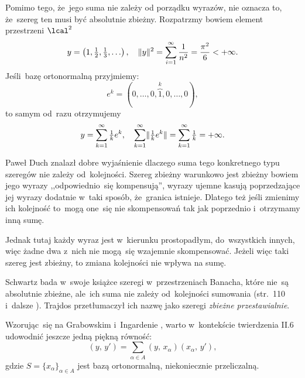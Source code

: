 \documentclass[a4paper,11pt]{article}
\begin{document}
Pomimo tego, że~jego suma nie zależy od porządku wyrazów, nie oznacza
to, że~szereg ten musi być absolutnie zbieżny. Rozpatrzmy bowiem
element przestrzeni $\lcal^{ 2 }$
\begin{equation*}
  \label{eq:RS-Vol-I-s01-19}
  y = \left( 1, \tfrac{ 1 }{ 2 }, \tfrac{ 1 }{ 3 }, \ldots \right), \quad
  \lVert{  y  }\rVert^{ 2 }
  = \sum_{ i = 1 }^{ \infty } \frac{ 1 }{ n^{ 2 } }
  = \frac{ \pi^{ 2 } }{ 6 } < +\infty.
\end{equation*}
Jeśli~bazę ortonormalną przyjmiemy:
\begin{equation}
  \label{eq:RS-Vol-I-s01-20}
  e^{ k } = ( 0, \ldots, 0, \overbrace{ 1 }^{ k }, 0, \ldots, 0),
\end{equation}
to samym od~razu otrzymujemy
\begin{equation}
  \label{eq:RS-Vol-I-s01-21}
  y =
  \sum_{ k = 1 }^{ \infty } \tfrac{ 1 }{ k } e^{ k }, \quad
  \sum_{ k = 1 }^{ \infty } \lVert{  \tfrac{ 1 }{ k } e^{ k }  }\rVert
  = \sum_{ k = 1 }^{ \infty } \tfrac{ 1 }{ k } = +\infty.
\end{equation}

Paweł Duch znalazł dobre wyjaśnienie dlaczego suma tego konkretnego
typu szeregów nie zależy od~kolejności. Szereg zbieżny warunkowo jest
zbieżny bowiem jego wyrazy ,,odpowiednio~się kompensują'', wyrazy
ujemne kasują poprzedzające jej wyrazy dodatnie w~taki sposób,
że~granica istnieje. Dlatego też jeśli zmienimy ich kolejność to~mogą
one~się nie skompensowań tak jak poprzednio i~otrzymamy inną sumę.

Jednak tutaj każdy wyraz jest w~kierunku prostopadłym, do~wszystkich
innych, więc żadne dwa z~nich nie mogą~się wzajemnie skompensować.
Jeżeli więc taki szereg jest zbieżny, to zmiana kolejności nie wpływa
na sumę.

Schwartz bada w~swoje książce szeregi w~przestrzeniach Banacha, które
nie~są absolutnie zbieżne, ale~ich suma nie zależy od~kolejności
sumowania (str.~110 i~dalsze
\cite{SchwartzKursAnalizyMatematycznejVolI1979}). Trajdos przetłumaczył ich
nazwę jako szeregi \textit{zbieżne przestawialnie}. %

\vspace{\spaceFour}



\start {} Wzorując~się na Grabowskim i~Ingardenie
\cite{GrabowskiIngardenMechanikaKwantowa1987}, warto w~kontekście
twierdzenia II.6 udowodnić jeszcze jedną piękną równość:
\begin{equation}
  \label{eq:RS-Vol-I-s01-22}
  ( y, \, y' ) =
  \sum_{ \alpha \in A } ( y, \, x_{ \alpha } ) ( x_{ \alpha }, \, y' ),
\end{equation}
gdzie $S = \{ x_{ \alpha } \}_{ \alpha \in A }$ jest bazą ortonormalną,
niekoniecznie przeliczalną.
\end{document}
